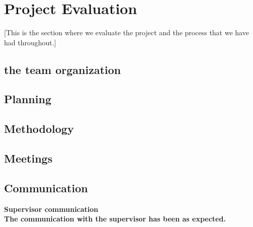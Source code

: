 \section{Project Evaluation}\label{Project Evaluation}
    [This is the section where we evaluate the project and the process that we have had throughout.]
    
    \subsection{ the team organization }
    \subsection{Planning}
    \subsection{Methodology}
    \subsection{ Meetings }
    \subsection{Communication}
        
        \bf{Supervisor communication} \\        
        The communication with the supervisor has been as expected. 

